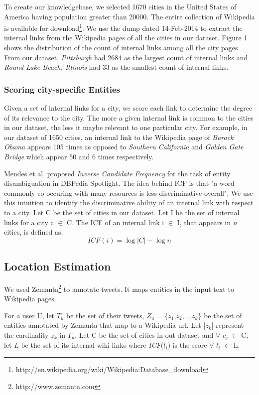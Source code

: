 To create our knowledgebase, we selected 1670 cities in the United States of America having population greater than 20000. The entire collection of Wikipedia is available for download\footnote{http://en.wikipedia.org/wiki/Wikipedia:Database\_download}. We use the dump dated 14-Feb-2014 to extract the internal links from the Wikipedia pages of all the cities in our dataset. Figure 1 shows the distribution of the count of internal links among all the city pages. From our dataset, \textit{Pittsburgh} had 2684 as the largest count of internal links and \textit{Round Lake Beach, Illinois} had 33 as the smallest count of internal links.

\subsubsection{Scoring city-specific Entities}
Given a set of internal links for a city, we score each link to determine the degree of its relevance to the city. The more a given internal link is common to the cities in our dataset, the less it maybe relevant to one particular city. For example, in our dataset of 1650 cities, an internal link to the Wikipedia page of \textit{Barack Obama} appears 105 times as opposed to \textit{Southern California} and \textit{Golden Gate Bridge} which appear 50 and 6 times respectively. 

Mendes et al. \cite{mendes2011dbpedia} proposed \textit{Inverse Candidate Frequency} for the task of entity disambiguation in DBPedia Spotlight. The idea behind ICF is that "a word commonly co-occuring with many resources is less discriminative overall". We use this intuition to identify the discriminative ability of an internal link with respect to a city. Let C be the set of cities in our dataset. Let I be the set of internal links for a city c $\in$ C. The ICF of an internal link i $\in$ I, that appears in \textit{n} cities, is defined as:
\begin{equation}
	ICF(i) = \log |C|- \log n
\end{equation}

\subsection{Location Estimation}
We used Zemanta\footnote{http://www.zemanta.com} to annotate tweets. It maps entities in the input text to Wikipedia pages.

For a user U, let $T_{u}$ be the set of their tweets, $Z_{u}$ = \{$z_{1}$,$z_{2}$,...,$z_{k}$\} be the set of entities annotated by Zemanta that map to a Wikipedia url. Let |$z_{k}$| represent the cardinality $z_{k}$ in $T_{u}$. Let C be the set of cities in out dataset and $\forall$ $c_{j}$ $\in$ C, let $L$ be the set of its internal wiki links where \textit{ICF}($l_{i}$) is the score $\forall$ $l_{i}$ $\in$ L.

